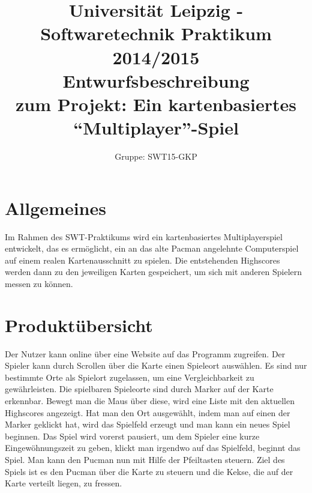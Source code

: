 \documentclass[11pt,a4paper]{article}
\author{Gruppe: SWT15-GKP}
\title{Universität Leipzig - Softwaretechnik Praktikum 2014/2015 \\  Entwurfsbeschreibung \\ zum Projekt: Ein kartenbasiertes “Multiplayer”-Spiel}
\begin{document}
\maketitle


\tableofcontents

\clearpage

\section{Allgemeines}
Im Rahmen des SWT-Praktikums wird ein kartenbasiertes Multiplayerspiel entwickelt, das es ermöglicht, ein an das alte Pacman angelehnte Computerspiel auf einem realen Kartenausschnitt zu spielen. Die entstehenden Highscores werden dann zu den jeweiligen Karten gespeichert, um sich mit anderen Spielern messen zu können.


\section{Produktübersicht}
Der Nutzer kann online über eine Website auf das Programm zugreifen.
Der Spieler kann durch Scrollen über die Karte einen Spieleort auswählen. Es sind nur bestimmte Orte als Spielort zugelassen, um eine Vergleichbarkeit zu gewährleisten.
Die spielbaren Spieleorte sind durch Marker auf der Karte erkennbar.
Bewegt man die Maus über diese, wird eine Liste mit den aktuellen Highscores angezeigt.
Hat man den Ort ausgewählt, indem man auf einen der Marker geklickt hat, wird das Spielfeld erzeugt und man kann ein neues Spiel beginnen. 
Das Spiel wird vorerst pausiert, um dem Spieler eine kurze Eingewöhnungszeit zu geben, klickt man irgendwo auf das Spielfeld, beginnt das Spiel.
Man kann den Pucman nun mit Hilfe der Pfeiltasten steuern.
Ziel des Spiels ist es den Pucman über die Karte zu steuern und die Kekse, die auf der Karte verteilt liegen, zu fressen. 
\end{document}
